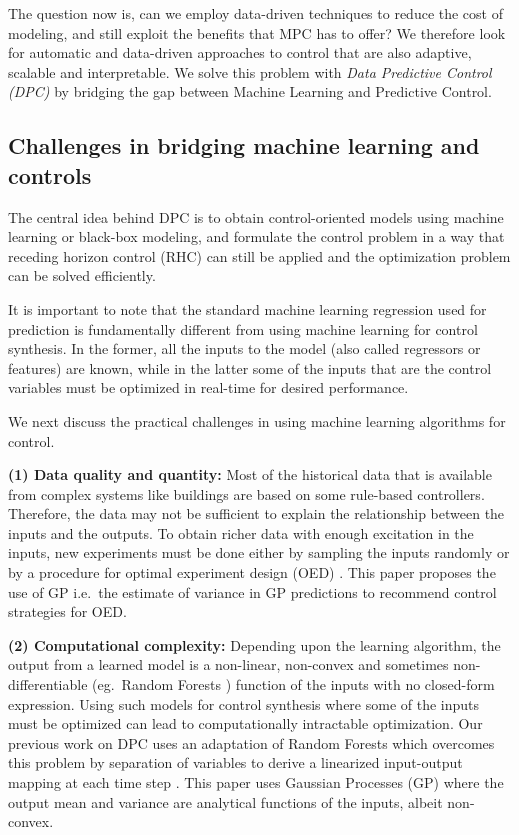 The question now is, can we employ data-driven techniques to reduce the cost of modeling, and still exploit the benefits that MPC has to offer? We therefore look for automatic and data-driven approaches to control that are also adaptive, scalable and interpretable. We solve this problem with \textit{Data Predictive Control (DPC)} by bridging the gap between Machine Learning and Predictive Control.

\subsection{Challenges in bridging machine learning and controls}
\label{SS:practical_challenges}

The central idea behind DPC is to obtain control-oriented models using machine learning or black-box modeling, and formulate the control problem in a way that receding horizon control (RHC) can still be applied and the optimization problem can be solved efficiently.

It is important to note that the standard machine learning regression used for prediction is fundamentally different from using machine learning for control synthesis. In the former, all the inputs to the model (also called regressors or features) are known, while in the latter some of the inputs that are the control variables must be optimized in real-time for desired performance. 

We next discuss the practical challenges in using machine learning algorithms for control.

\noindent \textbf{(1) Data quality and quantity:} Most of the historical data that is available from complex systems like buildings are based on some rule-based controllers. Therefore, the data may not be sufficient to explain the relationship between the inputs and the outputs. To obtain richer data with enough excitation in the inputs, new experiments must be done either by sampling the inputs randomly or by a procedure for optimal experiment design (OED) \cite{Emery1998,Fedorov2010}. This paper proposes the use of GP i.e.~the estimate of variance in GP predictions to recommend control strategies for OED.

\noindent \textbf{(2) Computational complexity:} Depending upon the learning algorithm, the output from a learned model is a non-linear, non-convex and sometimes non-differentiable (eg.~Random Forests \cite{Friedman2001}) function of the inputs with no closed-form expression. Using such models for control synthesis where some of the inputs must be optimized can lead to computationally intractable optimization. Our previous work on DPC uses an adaptation of Random Forests which overcomes this problem by separation of variables to derive a linearized input-output mapping at each time step \cite{JainACC2017,JainCDC2017}.
This paper uses Gaussian Processes (GP) where the output mean and variance are analytical functions of the inputs, albeit non-convex.

